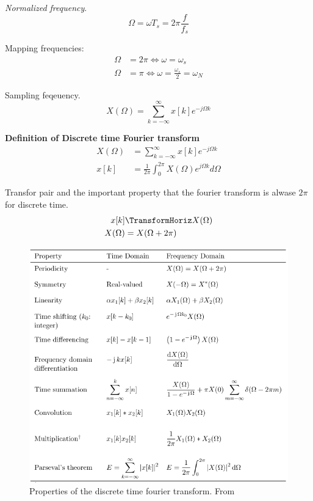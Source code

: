 \textit{Normalized frequency}.
\begin{equation*}
    \Omega = \omega T_s = 2\pi\frac{f}{f_s}
\end{equation*}

Mapping frequencies:
\begin{align*}
    \Omega &= 2\pi \Leftrightarrow \omega = \omega_s \\
    \Omega &= \pi \Leftrightarrow \omega = \frac{\omega_s}{2} = \omega_N
\end{align*}

Sampling feqeuency.
\begin{equation*}
    X(\Omega) = \sum_{k=-\infty}^{\infty} x[k]e^{-j\Omega k}
\end{equation*}

\textbf{Definition of Discrete time Fourier transform}
\begin{align*}
    X(\Omega) &= \sum_{k=-\infty}^{\infty} x[k]e^{-j\Omega k} \\
    x[k] &= \frac{1}{2\pi}\int_0^{2\pi} X(\Omega)e^{j\Omega k} d\Omega
\end{align*}

Transfor pair and the important property that the fourier transform is alwase 
$2\pi$ for discrete time.
\begin{align*}
    x[k] &\TransformHoriz X(\Omega) \\
    X(\Omega) &= X(\Omega + 2\pi)
\end{align*}

\begin{figure}[H]
    \centering
    \includegraphics[width=12cm]{image/properties_discrete_time_fourier_transform.png}
    \caption{Properties of the discrete time fourier transform. From \cite{}}
    \label{fig:properties_of_the_discrete_time_fourier_transform}
\end{figure}

